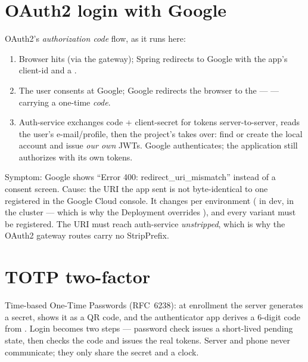 \section{OAuth2 login with Google}

OAuth2's \emph{authorization code} flow, as it runs here:

\begin{enumerate}
  \item Browser hits  (via the
  gateway); Spring redirects to Google with the app's client-id and a
  .
  \item The user consents at Google; Google redirects the browser to the
   ---  --- carrying a
  one-time \emph{code}.
  \item Auth-service exchanges code + client-secret for tokens
  server-to-server, reads the user's e-mail/profile, then the project's
   takes over: find or create the local
  account and issue \emph{our own} JWTs. Google authenticates; the
  application still authorizes with its own tokens.
\end{enumerate}

\begin{pitfall}
Symptom: Google shows ``Error 400: redirect\_uri\_mismatch'' instead of a
consent screen. Cause: the URI the app sent is not byte-identical to one
registered in the Google Cloud console. It changes per environment
( in dev,  in the cluster --- which is
why the Deployment overrides
), and every variant must be registered.
The URI must reach auth-service \emph{unstripped}, which is why the
OAuth2 gateway routes carry no StripPrefix.
\end{pitfall}

\section{TOTP two-factor}

Time-based One-Time Passwords (RFC~6238): at enrollment the server
generates a secret, shows it as a QR code, and the authenticator app
derives a 6-digit code from . Login becomes
two steps --- password check issues a short-lived pending state, then
 checks the code and issues the real tokens. Server and
phone never communicate; they only share the secret and a clock.

